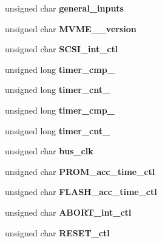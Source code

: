 \begin{DoxyCompactItemize}
unsigned char {\bfseries general\+\_\+inputs}
\item 
\mbox{\label{structmcchip__regs_af331403321ffaa55146fceb1122205e7}} 
unsigned char {\bfseries M\+V\+M\+E\+\_\+\_\+version}
\item 
\mbox{\label{structmcchip__regs_acc4a9c7ff0a76103d9f0c5a9eacee1a8}} 
unsigned char {\bfseries S\+C\+S\+I\+\_\+int\+\_\+ctl}
\item 
\mbox{\label{structmcchip__regs_a0789eb66a17a07dc55da77a3b09e53a5}} 
unsigned long {\bfseries timer\+\_\+cmp\+\_}
\item 
\mbox{\label{structmcchip__regs_aeb819085d4ac0400d40844f49b5c49df}} 
unsigned long {\bfseries timer\+\_\+cnt\+\_}
\item 
\mbox{\label{structmcchip__regs_ad46831c008b18b850c0beba690edd7d4}} 
unsigned long {\bfseries timer\+\_\+cmp\+\_}
\item 
\mbox{\label{structmcchip__regs_a9d3a25d04ec9719b6d59775dd8172013}} 
unsigned long {\bfseries timer\+\_\+cnt\+\_}
\item 
\mbox{\label{structmcchip__regs_a363b8f7676d361bcdfd7cfe670e7ce47}} 
unsigned char {\bfseries bus\+\_\+clk}
\item 
\mbox{\label{structmcchip__regs_a72a90a2a5abb6d97e1eec444a92c0432}} 
unsigned char {\bfseries P\+R\+O\+M\+\_\+acc\+\_\+time\+\_\+ctl}
\item 
\mbox{\label{structmcchip__regs_a9f5f3d7ab2ec6d4c77a1e753c44a25e1}} 
unsigned char {\bfseries F\+L\+A\+S\+H\+\_\+acc\+\_\+time\+\_\+ctl}
\item 
\mbox{\label{structmcchip__regs_a5abafc98fe55d6f9dd0e37855fe57e55}} 
unsigned char {\bfseries A\+B\+O\+R\+T\+\_\+int\+\_\+ctl}
\item 
\mbox{\label{structmcchip__regs_a1b1cf214a0f1cf774b0bc99bbe650c47}} 
unsigned char {\bfseries R\+E\+S\+E\+T\+\_\+ctl}

\end{DoxyCompactItemize}
